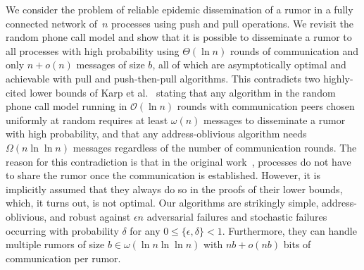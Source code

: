 We consider the problem of reliable epidemic dissemination of a rumor in a fully connected network of~$n$ processes using push and pull operations. We revisit the random phone call model and show that it is possible to disseminate a rumor to all processes with high probability using $\Theta(\ln n)$ rounds of communication and only $n+o(n)$ messages of size $b$, all of which are asymptotically optimal and achievable with pull and push-then-pull algorithms. This contradicts two highly-cited lower bounds of Karp et al.~\cite{DBLP:conf/focs/KarpSSV00} stating that any algorithm in the random phone call model running in $\mathcal{O}(\ln n)$ rounds with communication peers chosen uniformly at random requires at least $\omega(n)$ messages to disseminate a rumor with high probability, and that any address-oblivious algorithm needs $\Omega(n \ln \ln n)$ messages regardless of the number of communication rounds. The reason for this contradiction is that in the original work~\cite{DBLP:conf/focs/KarpSSV00}, processes do not have to share the rumor once the communication is established. However, it is implicitly assumed that they always do so in the proofs of their lower bounds, which, it turns out, is not optimal. Our algorithms are strikingly simple, address-oblivious, and robust against $\epsilon n$ adversarial failures and stochastic failures occurring with probability $\delta$ for any $0 \leq \{\epsilon,\delta\} < 1$. Furthermore, they can handle multiple rumors of size $b \in \omega(\ln n \ln \ln n)$ with $nb + o(nb)$ bits of communication per rumor. 

